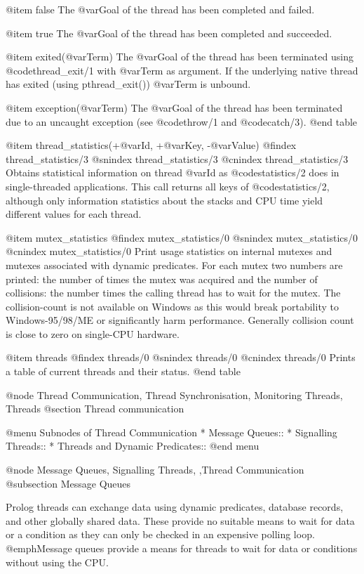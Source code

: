     @item false
The @var{Goal} of the thread has been completed and failed.

    @item true
The @var{Goal} of the thread has been completed and succeeded.

    @item exited(@var{Term})
The @var{Goal} of the thread has been terminated using @code{thread_exit/1}
with @var{Term} as argument.  If the underlying native thread has
exited (using pthread_exit()) @var{Term} is unbound.

    @item exception(@var{Term})
The @var{Goal} of the thread has been terminated due to an uncaught
exception (see @code{throw/1} and @code{catch/3}).
@end table

@item thread_statistics(+@var{Id}, +@var{Key}, -@var{Value})
@findex thread_statistics/3
@snindex thread_statistics/3
@cnindex thread_statistics/3
Obtains statistical information on thread @var{Id} as @code{statistics/2}
does in single-threaded applications.  This call returns all keys
of @code{statistics/2}, although only information statistics about the
stacks and CPU time yield different values for each thread.

@item mutex_statistics
@findex mutex_statistics/0
@snindex mutex_statistics/0
@cnindex mutex_statistics/0
Print usage statistics on internal mutexes and mutexes associated
with dynamic predicates.  For each mutex two numbers are printed:
the number of times the mutex was acquired and the number of
collisions: the number times the calling thread has to
wait for the mutex.  The collision-count is not available on
Windows as this would break portability to Windows-95/98/ME or
significantly harm performance.  Generally collision count is
close to zero on single-CPU hardware.

@item threads
@findex threads/0
@snindex threads/0
@cnindex threads/0
Prints a table of current threads and their status.
@end table


@node Thread Communication, Thread Synchronisation, Monitoring Threads, Threads
@section Thread communication

@menu
Subnodes of Thread Communication
* Message Queues::
* Signalling Threads::            
* Threads and Dynamic Predicates::   
@end menu

@node Message Queues, Signalling Threads, ,Thread Communication
@subsection Message Queues

Prolog threads can exchange data using dynamic predicates, database
records, and other globally shared data. These provide no suitable means
to wait for data or a condition as they can only be checked in an
expensive polling loop. @emph{Message queues} provide a means for
threads to wait for data or conditions without using the CPU.

